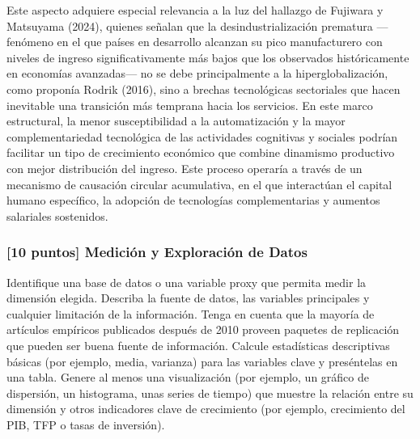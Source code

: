 \documentclass{article}
\theoremstyle{remark}
\theoremstyle{definition}
\begin{document}
\begin{tcolorbox}
Este aspecto adquiere especial relevancia a la luz del hallazgo de Fujiwara y Matsuyama (2024), quienes señalan que la desindustrialización prematura —fenómeno en el que países en desarrollo alcanzan su pico manufacturero con niveles de ingreso significativamente más bajos que los observados históricamente en economías avanzadas— no se debe principalmente a la hiperglobalización, como proponía Rodrik (2016), sino a brechas tecnológicas sectoriales que hacen inevitable una transición más temprana hacia los servicios. En este marco estructural, la menor susceptibilidad a la automatización y la mayor complementariedad tecnológica de las actividades cognitivas y sociales podrían facilitar un tipo de crecimiento económico que combine dinamismo productivo con mejor distribución del ingreso. Este proceso operaría a través de un mecanismo de causación circular acumulativa, en el que interactúan el capital humano específico, la adopción de tecnologías complementarias y aumentos salariales sostenidos.
\end{tcolorbox}

\subsubsection{[10 puntos] Medición y Exploración de Datos}

Identifique una base de datos o una variable proxy que permita medir la dimensión elegida. Describa la fuente de datos, las variables principales y cualquier limitación de la información. Tenga en cuenta que la mayoría de artículos empíricos publicados después de 2010 proveen paquetes de replicación que pueden ser buena fuente de información. Calcule estadísticas descriptivas básicas (por ejemplo, media, varianza) para las variables clave y preséntelas en una tabla. Genere al menos una visualización (por ejemplo, un gráfico de dispersión, un histograma, unas series de tiempo) que muestre la relación entre su dimensión y otros indicadores clave de crecimiento (por ejemplo, crecimiento del PIB, TFP o tasas de inversión).
\end{document}
